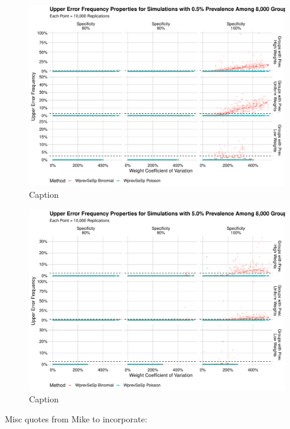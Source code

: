 \documentclass[AMA,STIX1COL]{WileyNJD-v2}
\begin{document}
\begin{figure}
    \centering
    \includegraphics[width=\textwidth]{figures/imperfect_upper_error_frequency_8000_0_005_reduced.pdf}
    \caption{Caption}
    \label{fig:imperfect_upper_error_frequency_8000_0_005_reduced}
\end{figure}

\begin{figure}
    \centering
    \includegraphics[width=\textwidth]{figures/imperfect_upper_error_frequency_8000_0_05_reduced.pdf}
    \caption{Caption}
    \label{fig:imperfect_upper_error_frequency_8000_0_05_reduced.pdf}
\end{figure}

Misc quotes from Mike to incorporate:
\end{document}
